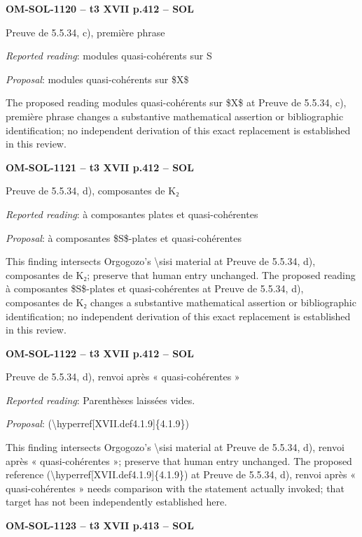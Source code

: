 \par\noindent\textbf{OM-SOL-1120 -- t3 XVII p.412 -- SOL}\par
Preuve de 5.5.34, c), première phrase\par
\emph{Reported reading}: modules quasi-cohérents sur S\par
\emph{Proposal}: modules quasi-cohérents sur \$X\$\par
The proposed reading modules quasi-cohérents sur \$X\$ at Preuve de 5.5.34, c), première phrase changes a substantive mathematical assertion or bibliographic identification; no independent derivation of this exact replacement is established in this review.\par
\par\noindent\textbf{OM-SOL-1121 -- t3 XVII p.412 -- SOL}\par
Preuve de 5.5.34, d), composantes de K₂\par
\emph{Reported reading}: à composantes plates et quasi-cohérentes\par
\emph{Proposal}: à composantes \$S\$-plates et quasi-cohérentes\par
This finding intersects Orgogozo's \textbackslash{}sisi material at Preuve de 5.5.34, d), composantes de K₂; preserve that human entry unchanged. The proposed reading à composantes \$S\$-plates et quasi-cohérentes at Preuve de 5.5.34, d), composantes de K₂ changes a substantive mathematical assertion or bibliographic identification; no independent derivation of this exact replacement is established in this review.\par
\par\noindent\textbf{OM-SOL-1122 -- t3 XVII p.412 -- SOL}\par
Preuve de 5.5.34, d), renvoi après « quasi-cohérentes »\par
\emph{Reported reading}: Parenthèses laissées vides.\par
\emph{Proposal}: (\textbackslash{}hyperref[XVII.def4.1.9]\{4.1.9\})\par
This finding intersects Orgogozo's \textbackslash{}sisi material at Preuve de 5.5.34, d), renvoi après « quasi-cohérentes »; preserve that human entry unchanged. The proposed reference (\textbackslash{}hyperref[XVII.def4.1.9]\{4.1.9\}) at Preuve de 5.5.34, d), renvoi après « quasi-cohérentes » needs comparison with the statement actually invoked; that target has not been independently established here.\par
\par\noindent\textbf{OM-SOL-1123 -- t3 XVII p.413 -- SOL}\par
